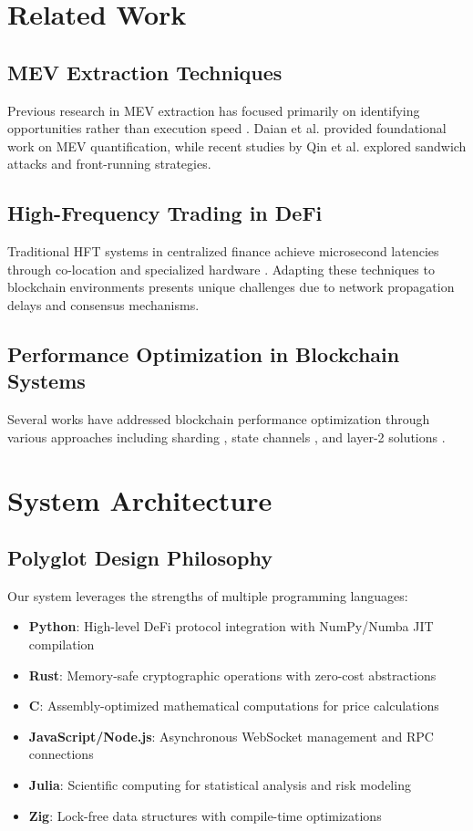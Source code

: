 \documentclass[12pt]{article}
\begin{document}
\section{Related Work}

\subsection{MEV Extraction Techniques}
Previous research in MEV extraction has focused primarily on identifying opportunities rather than execution speed \cite{flashboys2020}. Daian et al. \cite{daian2020flash} provided foundational work on MEV quantification, while recent studies by Qin et al. \cite{qin2021attacking} explored sandwich attacks and front-running strategies.

\subsection{High-Frequency Trading in DeFi}
Traditional HFT systems in centralized finance achieve microsecond latencies through co-location and specialized hardware \cite{aldridge2013high}. Adapting these techniques to blockchain environments presents unique challenges due to network propagation delays and consensus mechanisms.

\subsection{Performance Optimization in Blockchain Systems}
Several works have addressed blockchain performance optimization through various approaches including sharding \cite{kokoris2018omniledger}, state channels \cite{poon2016bitcoin}, and layer-2 solutions \cite{poon2017plasma}.

\section{System Architecture}

\subsection{Polyglot Design Philosophy}

Our system leverages the strengths of multiple programming languages:

\begin{itemize}
    \item \textbf{Python}: High-level DeFi protocol integration with NumPy/Numba JIT compilation
    \item \textbf{Rust}: Memory-safe cryptographic operations with zero-cost abstractions
    \item \textbf{C}: Assembly-optimized mathematical computations for price calculations
    \item \textbf{JavaScript/Node.js}: Asynchronous WebSocket management and RPC connections
    \item \textbf{Julia}: Scientific computing for statistical analysis and risk modeling
    \item \textbf{Zig}: Lock-free data structures with compile-time optimizations
\end{itemize}
\end{document}
